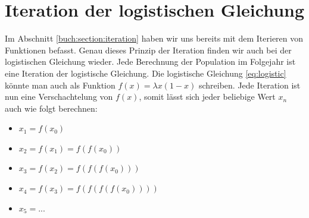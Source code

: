 %
%
%
\section{Iteration der logistischen Gleichung
\label{logistic:section:analyse}}

Im Abschnitt \ref{buch:section:iteration} haben wir uns
bereits mit dem Iterieren von Funktionen befasst. 
Genau dieses Prinzip der Iteration finden wir auch bei
der logistischen Gleichung wieder. 
Jede Berechnung der Population im Folgejahr ist 
eine Iteration der logistische Gleichung.
Die logistische Gleichung \eqref{eq:logistic} könnte man 
auch als Funktion $f(x) = \lambda x(1-x)$ schreiben.
Jede Iteration ist nun eine Verschachtelung von $f(x)$,
somit lässt sich jeder beliebige Wert $x_n$ auch wie folgt berechnen:  
\begin{itemize}
    \item $x_1 = f(x_0)$
    \item $x_2 = f(x_1) = f(f(x_0))$
    \item $x_3 = f(x_2) = f(f(f(x_0)))$
    \item $x_4 = f(x_3) = f(f(f(f(x_0))))$
    \item $x_5 = ...$
\end{itemize}

